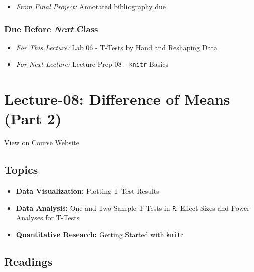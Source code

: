 \documentclass[]{book}
\providecommand{\tightlist}{%
  \setlength{\itemsep}{0pt}\setlength{\parskip}{0pt}}
\theoremstyle{definition}
\theoremstyle{definition}
\theoremstyle{definition}
\theoremstyle{remark}
\begin{document}
\begin{itemize}
\tightlist
\item
  \emph{From Final Project:} Annotated bibliography due
\end{itemize}

\hypertarget{due-before-next-class-7}{%
\subsubsection*{\texorpdfstring{Due Before \emph{Next}
Class}{Due Before Next Class}}\label{due-before-next-class-7}}

\begin{itemize}
\tightlist
\item
  \emph{For This Lecture:} Lab 06 - T-Tests by Hand and Reshaping Data
\item
  \emph{For Next Lecture:} Lecture Prep 08 - \texttt{knitr} Basics
\end{itemize}

\hypertarget{lecture-08-difference-of-means-part-2}{%
\section*{Lecture-08: Difference of Means (Part
2)}\label{lecture-08-difference-of-means-part-2}}

View on Course Website

\hypertarget{topics-8}{%
\subsection*{Topics}\label{topics-8}}

\begin{itemize}
\tightlist
\item
  \textbf{Data Visualization:} Plotting T-Test Results
\item
  \textbf{Data Analysis:} One and Two Sample T-Tests in \texttt{R};
  Effect Sizes and Power Analyses for T-Tests
\item
  \textbf{Quantitative Research:} Getting Started with \texttt{knitr}
\end{itemize}

\hypertarget{readings-9}{%
\subsection*{Readings}\label{readings-9}}
\end{document}
